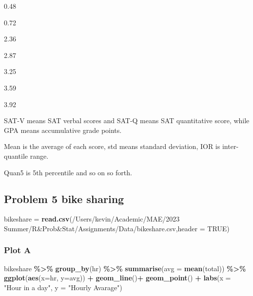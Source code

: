 \documentclass[
]{article}
\newenvironment{Shaded}{\begin{snugshade}}{\end{snugshade}}
\newcommand{\AttributeTok}[1]{\textcolor[rgb]{0.13,0.29,0.53}{#1}}
\newcommand{\ConstantTok}[1]{\textcolor[rgb]{0.56,0.35,0.01}{#1}}
\newcommand{\FunctionTok}[1]{\textcolor[rgb]{0.13,0.29,0.53}{\textbf{#1}}}
\newcommand{\NormalTok}[1]{#1}
\newcommand{\OtherTok}[1]{\textcolor[rgb]{0.56,0.35,0.01}{#1}}
\newcommand{\SpecialCharTok}[1]{\textcolor[rgb]{0.81,0.36,0.00}{\textbf{#1}}}
\newcommand{\StringTok}[1]{\textcolor[rgb]{0.31,0.60,0.02}{#1}}
\begin{document}
0.48

0.72

2.36

2.87

3.25

3.59

3.92

SAT-V means SAT verbal scores and SAT-Q means SAT quantitative score, while GPA means accumulative grade points.

Mean is the average of each score, std means standard deviation, IOR is inter-quantile range.

Quan5 is 5th percentile and so on so forth.

\hypertarget{problem-5-bike-sharing}{%
\subsection{Problem 5 bike sharing}\label{problem-5-bike-sharing}}

\begin{Shaded}
\begin{Highlighting}[]
\NormalTok{bikeshare }\OtherTok{=} \FunctionTok{read.csv}\NormalTok{(}\StringTok{\textquotesingle{}/Users/kevin/Academic/MAE/2023 Summer/R\&Prob\&Stat/Assignments/Data/bikeshare.csv\textquotesingle{}}\NormalTok{,}\AttributeTok{header =} \ConstantTok{TRUE}\NormalTok{)}
\end{Highlighting}
\end{Shaded}

\hypertarget{plot-a}{%
\subsubsection{Plot A}\label{plot-a}}

\begin{Shaded}
\begin{Highlighting}[]
\NormalTok{bikeshare }\SpecialCharTok{\%\textgreater{}\%}
  \FunctionTok{group\_by}\NormalTok{(hr) }\SpecialCharTok{\%\textgreater{}\%}
  \FunctionTok{summarise}\NormalTok{(}\AttributeTok{avg =} \FunctionTok{mean}\NormalTok{(total)) }\SpecialCharTok{\%\textgreater{}\%}
  \FunctionTok{ggplot}\NormalTok{(}\FunctionTok{aes}\NormalTok{(}\AttributeTok{x=}\NormalTok{hr, }\AttributeTok{y=}\NormalTok{avg)) }\SpecialCharTok{+} \FunctionTok{geom\_line}\NormalTok{()}\SpecialCharTok{+} \FunctionTok{geom\_point}\NormalTok{() }\SpecialCharTok{+} \FunctionTok{labs}\NormalTok{(}\AttributeTok{x =} \StringTok{"Hour in a day"}\NormalTok{, }\AttributeTok{y =} \StringTok{"Hourly Avarage"}\NormalTok{)}
\end{Highlighting}
\end{Shaded}
\end{document}
